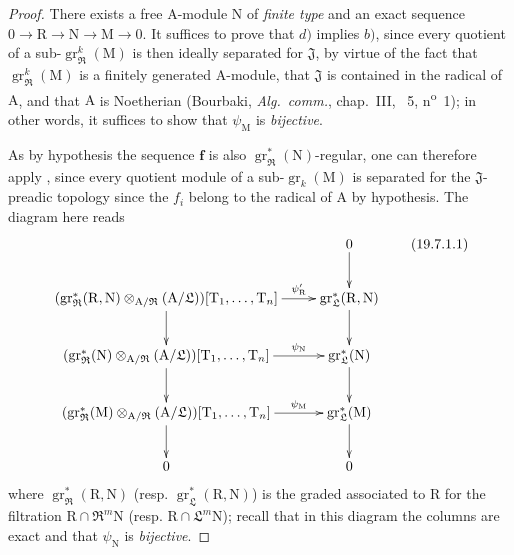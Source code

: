 \begin{proof}
There exists a free $\mathrm{A}$-module $\mathrm{N}$ of \emph{finite type} and an exact sequence $0\to\mathrm{R}\to\mathrm{N}\to\mathrm{M}\to 0$. It suffices to prove that $d)$ implies $b)$, since every quotient of a sub-$\operatorname{gr}_\mathfrak{R}^k(\mathrm{M})$ is then ideally separated for $\mathfrak{J}$, by virtue of the fact that $\operatorname{gr}_\mathfrak{R}^k(\mathrm{M})$ is a finitely generated $\mathrm{A}$-module, that $\mathfrak{J}$ is contained in the radical of $\mathrm{A}$, and that $\mathrm{A}$ is Noetherian (Bourbaki, \emph{Alg.~comm.}, chap.~III, \textsection~5, n\textsuperscript{o}~1); in other words, it suffices to show that $\psi_\mathrm{M}$ is \emph{bijective}.

As by hypothesis the sequence $\mathbf{f}$ is also $\operatorname{gr}_\mathfrak{R}^*(\mathrm{N})$-regular, one can therefore apply , since every quotient module of a sub-$\operatorname{gr}_k(\mathrm{M})$ is separated for the $\mathfrak{J}$-preadic topology since the $f_i$ belong to the radical of $\mathrm{A}$ by hypothesis. The diagram  here reads
\[
\xymatrix{
  & 0 \ar[d] \\
  (\operatorname{gr}_\mathfrak{R}^*(\mathrm{R},\mathrm{N})\otimes_{\mathrm{A}/\mathfrak{R}}(\mathrm{A}/\mathfrak{L}))[\mathrm{T}_1,\ldots,\mathrm{T}_n] \ar[r]^-{\psi_\mathrm{R}'} \ar[d] & \operatorname{gr}_\mathfrak{L}^*(\mathrm{R},\mathrm{N}) \ar[d] \\
  (\operatorname{gr}_\mathfrak{R}^*(\mathrm{N})\otimes_{\mathrm{A}/\mathfrak{R}}(\mathrm{A}/\mathfrak{L}))[\mathrm{T}_1,\ldots,\mathrm{T}_n] \ar[r]^-{\psi_\mathrm{N}} \ar[d] & \operatorname{gr}_\mathfrak{L}^*(\mathrm{N}) \ar[d] \\
  (\operatorname{gr}_\mathfrak{R}^*(\mathrm{M})\otimes_{\mathrm{A}/\mathfrak{R}}(\mathrm{A}/\mathfrak{L}))[\mathrm{T}_1,\ldots,\mathrm{T}_n] \ar[r]^-{\psi_\mathrm{M}} \ar[d] & \operatorname{gr}_\mathfrak{L}^*(\mathrm{M}) \ar[d] \\
  0 & 0
}
\tag{19.7.1.1}
\]
where $\operatorname{gr}_\mathfrak{R}^*(\mathrm{R},\mathrm{N})$ (resp. $\operatorname{gr}_\mathfrak{L}^*(\mathrm{R},\mathrm{N})$) is the graded associated to $\mathrm{R}$ for the filtration $\mathrm{R}\cap\mathfrak{R}^m\mathrm{N}$ (resp. $\mathrm{R}\cap\mathfrak{L}^m\mathrm{N}$); recall that in this diagram the columns are exact and that $\psi_\mathrm{N}$ is \emph{bijective}.


\end{proof}
